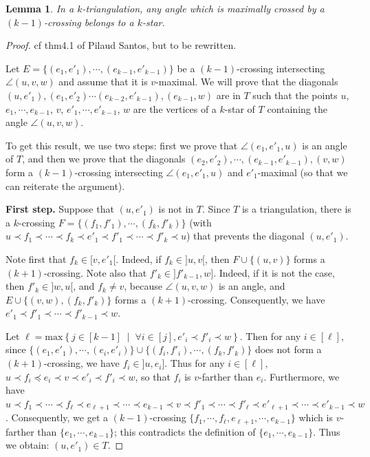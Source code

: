 \documentclass{amsart}
\newtheorem{lemma}[theorem]{Lemma}
\theoremstyle{remark}
\newcommand*{\ktg}[0]{$k$-triangulation\xspace}
\newcommand{\cl}{\prec}
\newcommand{\cle}{\preccurlyeq}
\newcommand{\set}[2]{\left\{ #1 \;\middle|\; #2 \right\}} %
\begin{document}
\begin{lemma}
In a \ktg, any angle which is maximally crossed by a $(k-1)$-crossing belongs to a $k$-star.
\end{lemma}
\begin{proof}
cf thm4.1 of  Pilaud Santos, but to be rewritten.





Let $E=\{(e_1,e'_1), \cdots , (e_{k-1},e'_{k-1})\}$ be a $(k - 1)$-crossing intersecting $\angle(u, v, w)$ and assume that it is $v$-maximal. 
We will prove that the diagonals $(u, e'_1),(e_1, e'_2)\cdots(e_{k-2}, e'_{k-1}), (e_{k-1}, w)$ are in $T$ such that the points $u$, $e_1,\cdots,e_{k-1}$, $v$, $e'_1,\cdots,e'_{k-1}$, $w$ are the vertices of a $k$-star of $T$ containing the angle $\angle(u, v, w)$. 

To get this result, we use two steps: first we prove that $\angle(e_1, e'_1, u)$ is an angle of $T$, and then we prove that the diagonals $(e_2,e'_2),\cdots, (e_{k-1},e'_{k-1}), (v, w)$ form a $(k-1)$-crossing intersecting $\angle(e_1, e'_1, u)$ and $e'_1$-maximal (so that we can reiterate the argument).

{\bf First step.}
Suppose that $(u, e'_1)$ is not in $T$. 
Since $T$ is a triangulation, there is a $k$-crossing $F=\{(f_1, f'_1),\cdots, (f_k, f'_k)\}$ (with $u \cl f_1 \cl \cdots \cl f_k \cl e'_1 \cl f'_1 \cl \cdots \cl f'_k \cl u$) that prevents the diagonal $(u, e'_1)$.

Note first that $f_k \in [v,e'_1[$. Indeed, if $f_k \in ]u, v[$, then $F \cup \{(u, v)\}$ forms a $(k + 1)$-crossing.
Note also that $f'_k \in ]f'_{k-1},w]$. Indeed, if it is not the case, then $f'_k \in ]w, u[$, and $f_k \neq v$, because $\angle(u, v, w)$ is an angle, and $E \cup \{(v,w),(f_k, f'_k)\}$ forms a $(k + 1)$-crossing. 
Consequently, we have $e'_1 \cl f'_1 \cl \cdots \cl f'_{k-1} \cl w$.

Let $\ell = \text{max}\set{j\in[k-1]}{\forall i\in[j],e'_i \cl f'_i \cl w}$.
Then for any $i\in[\ell]$, since $\{(e_1,e'_1), \cdots , (e_i,e'_i)\} \cup \{(f_i,f'_i), \cdots , (f_k,f'_k)\}$ does not form a $(k + 1)$-crossing, we have $f_i \in ]u, e_i]$. 
Thus for any $i\in[\ell]$, $u \cl f_i \cle e_i \cl v \cl e'_i \cl f'_i \cl w$, so that $f_i$ is $v$-farther than $e_i$.
Furthermore, we have $u \cl f_1 \cl \cdots \cl f_\ell \cl e_{\ell+1} \cl \cdots \cl e_{k-1} \cl v \cl f'_1 \cl \cdots \cl f'_\ell \cl e'_{\ell+1} \cl \cdots \cl e'_{k-1} \cl w$. 
Consequently, we get a $(k - 1)$-crossing $\{f_1, \cdots , f_\ell
, e_{\ell+1}, \cdots , e_{k-1}\}$ which is $v$-farther than $\{e_1, \cdots , e_{k-1}\}$; this contradicts the definition of $\{e_1, \cdots , e_{k-1}\}$. 
Thus we obtain: $(u, e'_1) \in  T$.


\end{proof}
\end{document}
